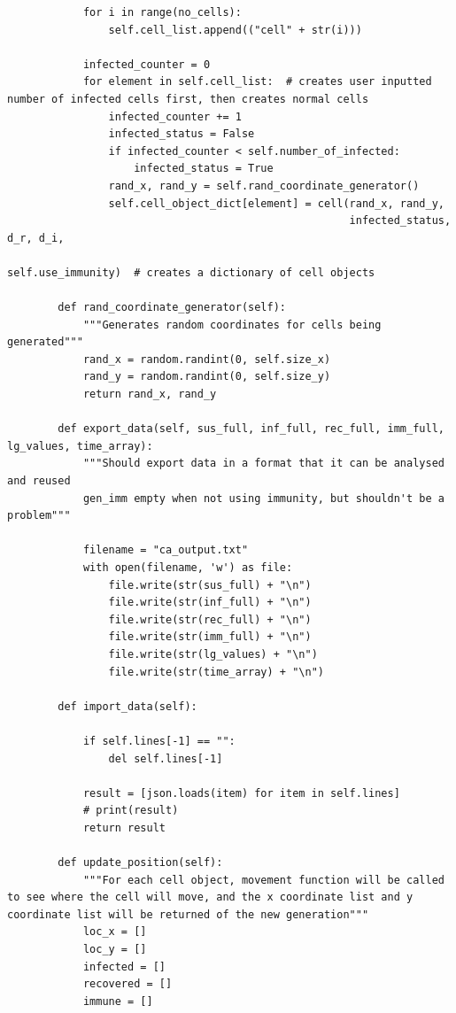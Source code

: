 \documentclass[11pt, a4paper]{article}
\begin{document}
\begin{lstlisting}
            for i in range(no_cells):
                self.cell_list.append(("cell" + str(i)))
    
            infected_counter = 0
            for element in self.cell_list:  # creates user inputted number of infected cells first, then creates normal cells
                infected_counter += 1
                infected_status = False
                if infected_counter < self.number_of_infected:
                    infected_status = True
                rand_x, rand_y = self.rand_coordinate_generator()
                self.cell_object_dict[element] = cell(rand_x, rand_y,
                                                      infected_status, d_r, d_i,
                                                      self.use_immunity)  # creates a dictionary of cell objects
    
        def rand_coordinate_generator(self):
            """Generates random coordinates for cells being generated"""
            rand_x = random.randint(0, self.size_x)
            rand_y = random.randint(0, self.size_y)
            return rand_x, rand_y
    
        def export_data(self, sus_full, inf_full, rec_full, imm_full, lg_values, time_array):
            """Should export data in a format that it can be analysed and reused
            gen_imm empty when not using immunity, but shouldn't be a problem"""
        
            filename = "ca_output.txt"
            with open(filename, 'w') as file:
                file.write(str(sus_full) + "\n")
                file.write(str(inf_full) + "\n")
                file.write(str(rec_full) + "\n")
                file.write(str(imm_full) + "\n")
                file.write(str(lg_values) + "\n")
                file.write(str(time_array) + "\n")
    
        def import_data(self):
    
            if self.lines[-1] == "":
                del self.lines[-1]
    
            result = [json.loads(item) for item in self.lines]
            # print(result)
            return result
    
        def update_position(self):
            """For each cell object, movement function will be called to see where the cell will move, and the x coordinate list and y coordinate list will be returned of the new generation"""
            loc_x = []
            loc_y = []
            infected = []
            recovered = []
            immune = []
    

\end{lstlisting}
\end{document}
